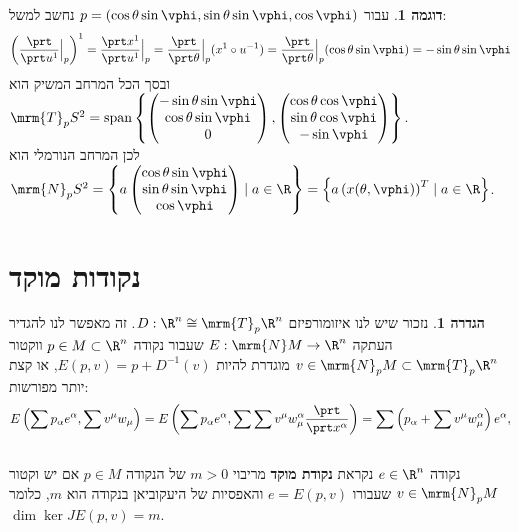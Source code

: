 \documentclass{article}
\theoremstyle{definition}
\newtheorem*{definition*}{הגדרה}
\newtheorem*{example*}{דוגמה}
\DeclareMathOperator{\spn}{span}
\begin{document}
	\begin{example*}
		עבור
		\(p=(\cos\theta \sin\vphi, \sin\theta \sin\vphi, \cos\vphi)\)
		נחשב למשל:
		\[
			\left(\frac{\prt}{\prt u^1}\Big|_p\right)^1
			= \frac{\prt x^1}{\prt u^1}\Big|_p
			= \frac{\prt}{\prt \theta}\Big|_p (x^1 \circ u^{-1})
			= \frac{\prt}{\prt \theta}\Big|_p (\cos\theta \sin\vphi)
			= -\sin\theta \sin\vphi
		\]
		ובסך הכל המרחב המשיק הוא
		\(
			\mrm{T}_p S^2
			= \spn\left\{
				\begin{pmatrix}
					-\sin\theta \sin\vphi \\ \cos\theta \sin\vphi \\ 0
				\end{pmatrix},
				\begin{pmatrix}
					\cos\theta \cos\vphi \\ \sin\theta \cos\vphi \\ -\sin\vphi
				\end{pmatrix}
			\right\}
		\).
		\\
		לכן המרחב הנורמלי הוא
		\(
			\mrm{N}_p S^2
			= \left\{
				a
				\begin{pmatrix}
					\cos\theta \sin\vphi \\ \sin\theta \sin\vphi \\ \cos\vphi
				\end{pmatrix}
				\mid
				a \in \R
			\right\}
			= \left\{
				a
				\left(x(\theta, \vphi)\right)^T
				\mid
				a \in \R
			\right\}
		\).
	\end{example*}




	\section{נקודות מוקד}

	\begin{definition*}
		נזכור שיש לנו איזומורפיזם
		\(D:\R^n \cong \mrm{T}_p \R^n\).
		זה מאפשר לנו להגדיר העתקה
		\(E:\mrm{N} M \to \R^n\)
		שעבור נקודה
		\(p \in M \subset \R^n\)
		ווקטור
		\(v \in \mrm{N}_p M \subset \mrm{T}_p \R^n\)
		מוגדרת להיות
		\(E(p,v)=p+D^{-1}(v)\),
		או קצת יותר מפורשות:
		\[
			E\left(\sum p_\alpha e^\alpha,\sum v^\mu w_\mu\right)
			= E\left(\sum p_\alpha e^\alpha,\sum \sum v^\mu w_\mu^\alpha \frac{\prt}{\prt x^\alpha}\right)
			= \sum \left(p_\alpha + \sum v^\mu w_\mu^\alpha\right) e^\alpha,
		\]
		\\
		נקודה
		\(e \in \R^n\)
		נקראת \textbf{נקודת מוקד} מריבוי
		\(m>0\)
		של הנקודה
		\(p \in M\)
		אם יש וקטור
		\(v \in \mrm{N}_p M\)
		שעבורו
		\(e = E(p,v)\)
		והאפסיות של היעקוביאן בנקודה הוא \(m\), כלומר
		\(\dim \ker JE(p,v) = m\).
	\end{definition*}
\end{document}
